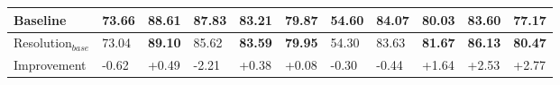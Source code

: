 \begin{table}[h]
{\begin{tabular}{lllllllllll}
\multicolumn{1}{|l|}{Baseline}        & \multicolumn{1}{l|}{\textbf{73.66}} & \multicolumn{1}{l|}{88.61} & \multicolumn{1}{l|}{\textbf{87.83}} & \multicolumn{1}{l|}{83.21} & \multicolumn{1}{l|}{79.87}  & \multicolumn{1}{l|}{\textbf{54.60}} & \multicolumn{1}{l|}{\textbf{84.07}} & \multicolumn{1}{l|}{80.03} & \multicolumn{1}{l|}{83.60} & \multicolumn{1}{l|}{77.17} \\ \hline
\multicolumn{1}{|l|}{Resolution$_{base}$} & \multicolumn{1}{l|}{73.04} & \multicolumn{1}{l|}{\textbf{89.10}} & \multicolumn{1}{l|}{85.62} & \multicolumn{1}{l|}{\textbf{83.59}} & \multicolumn{1}{l|}{\textbf{79.95}}  & \multicolumn{1}{l|}{54.30} & \multicolumn{1}{l|}{83.63} & \multicolumn{1}{l|}{\textbf{81.67}} & \multicolumn{1}{l|}{\textbf{86.13}} & \multicolumn{1}{l|}{\textbf{80.47}} \\ \hline
\multicolumn{1}{|l|}{Improvement}     & \multicolumn{1}{l|}{-0.62} & \multicolumn{1}{l|}{+0.49} & \multicolumn{1}{l|}{-2.21} & \multicolumn{1}{l|}{+0.38} & \multicolumn{1}{l|}{+0.08}  & \multicolumn{1}{l|}{-0.30} & \multicolumn{1}{l|}{-0.44} & \multicolumn{1}{l|}{+1.64} & \multicolumn{1}{l|}{+2.53} & \multicolumn{1}{l|}{+2.77} \\ \hline
\end{tabular}
%
}
\end{table}




